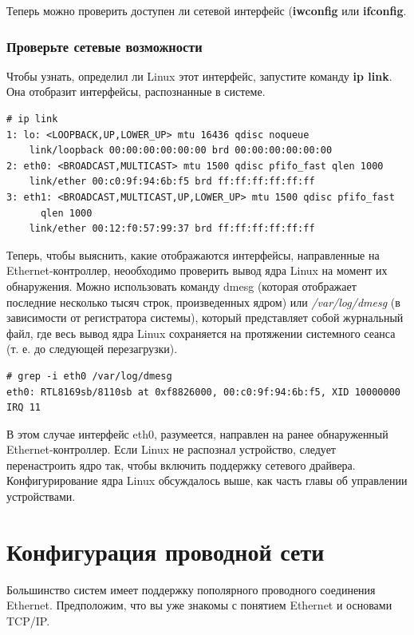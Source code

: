\documentclass[10pt]{book}
\begin{document}
Теперь можно проверить доступен ли сетевой интерфейс (\textbf{iwconfig} или \textbf{ifconfig}.

\subsubsection{Проверьте сетевые возможности}
Чтобы узнать, определил ли Linux этот интерфейс, запустите команду \textbf{ip link}. Она отобразит интерфейсы, распознанные в системе.

\begin{tcolorbox}
\begin{lstlisting}
# ip link
1: lo: <LOOPBACK,UP,LOWER_UP> mtu 16436 qdisc noqueue
    link/loopback 00:00:00:00:00:00 brd 00:00:00:00:00:00
2: eth0: <BROADCAST,MULTICAST> mtu 1500 qdisc pfifo_fast qlen 1000
    link/ether 00:c0:9f:94:6b:f5 brd ff:ff:ff:ff:ff:ff
3: eth1: <BROADCAST,MULTICAST,UP,LOWER_UP> mtu 1500 qdisc pfifo_fast
      qlen 1000
    link/ether 00:12:f0:57:99:37 brd ff:ff:ff:ff:ff:ff
\end{lstlisting}
\end{tcolorbox}
Теперь, чтобы выяснить, какие отображаются интерфейсы, направленные на Ethernet-контроллер, неообходимо проверить вывод ядра Linux на момент их обнаружения. Можно использовать команду dmesg (которая отображает последние несколько тысяч строк, произведенных ядром) или \textit{/var/log/dmesg} (в зависимости от регистратора системы), который представляет собой журнальный файл, где весь вывод ядра Linux сохраняется на протяжении системного сеанса (т. е. до следующей перезагрузки).

\begin{tcolorbox}
\begin{lstlisting}
# grep -i eth0 /var/log/dmesg
eth0: RTL8169sb/8110sb at 0xf8826000, 00:c0:9f:94:6b:f5, XID 10000000
IRQ 11
\end{lstlisting}
\end{tcolorbox}

В этом случае интерфейс eth0, разумеется, направлен на ранее обнаруженный Ethernet-контроллер.
Если Linux не распознал устройство, следует перенастроить ядро так, чтобы включить поддержку сетевого драйвера. Конфигурирование ядра Linux обсуждалось выше, как часть главы об управлении устройствами.

\section{Конфигурация проводной сети}
Большинство систем имеет поддержку пополярного проводного соединения Ethernet. Предположим, что вы уже знакомы с понятием Ethernet и основами TCP/IP.
\end{document}
